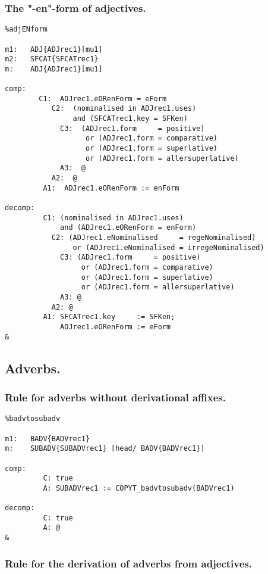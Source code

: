 \subsubsection{The "-en"-form of adjectives.}
\begin{verbatim}
%adjENform

m1:   ADJ{ADJrec1}[mu1]
m2:   SFCAT{SFCATrec1}
m:    ADJ{ADJrec1}[mu1]

comp: 
        C1:  ADJrec1.eORenForm = eForm
           C2:  (nominalised in ADJrec1.uses) 
                and (SFCATrec1.key = SFKen) 
             C3:  (ADJrec1.form     = positive) 
                   or (ADJrec1.form = comparative)
                   or (ADJrec1.form = superlative) 
                   or (ADJrec1.form = allersuperlative)
             A3:  @
           A2:  @
         A1:  ADJrec1.eORenForm := enForm

decomp:  
         C1: (nominalised in ADJrec1.uses) 
             and (ADJrec1.eORenForm = enForm) 
           C2: (ADJrec1.eNominalised     = regeNominalised)
                or (ADJrec1.eNominalised = irregeNominalised)
             C3: (ADJrec1.form     = positive) 
                  or (ADJrec1.form = comparative) 
                  or (ADJrec1.form = superlative) 
                  or (ADJrec1.form = allersuperlative)
             A3: @
           A2: @
         A1: SFCATrec1.key     := SFKen;
             ADJrec1.eORenForm := eForm
&
\end{verbatim}
\newpage
\subsection{Adverbs.}
\subsubsection{Rule for adverbs without derivational affixes.}
\begin{verbatim}
%badvtosubadv

m1:   BADV{BADVrec1}
m:    SUBADV{SUBADVrec1} [head/ BADV{BADVrec1}]

comp:    
         C: true
         A: SUBADVrec1 := COPYT_badvtosubadv(BADVrec1)

decomp:  
         C: true
         A: @
&
\end{verbatim}
\newpage
\subsubsection{Rule for the derivation of adverbs from adjectives.}

